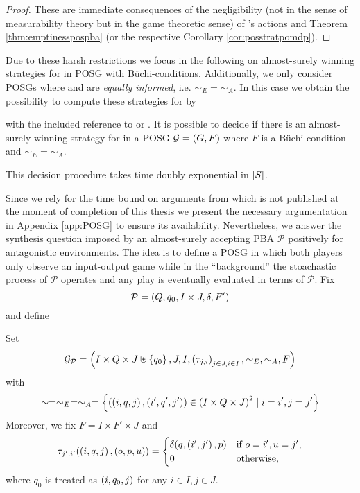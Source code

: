 \begin{proof}
  These are immediate consequences of the negligibility (not in the sense of
  measurability theory but in the game theoretic sense) of \adam{}'s actions
  and Theorem \ref{thm:emptinesspospba} (or the respective Corollary 
  \ref{cor:posstratpomdp}).
\end{proof}
Due to these harsh restrictions we focus in the following on almost-surely 
winning strategies for \eve{} in \ac{POSG} with Büchi-conditions. Additionally,
we only consider \acp{POSG} where \eve{} and \adam{} are 
\emph{equally informed}, i.e. $\sim_{E} = \sim_{A}$. In this case
we obtain the possibility to compute these strategies for \eve{} by
\begin{theorem}
  \cite[Theorem 6]{POSG} with the included reference to 
  \cite[Lemma 4]{DecProblemsForProbAuto} or \cite[Theorem 5.3]{PureStratPOSG}.
  It is possible to decide if there is an almost-surely winning strategy for 
  \eve{} in a \ac{POSG} $\mathcal{G} = \left(G, F\right)$ where $F$ is a 
  Büchi-condition and $\sim_{E} = \sim_{A}$.

  This decision procedure takes time doubly exponential in $\left\vert{S}\right\vert$.
  \label{thm:StratPOSG}
\end{theorem}
Since we rely for the time bound on arguments from \cite{PureStratPOSG} which 
is not published at the moment of completion of this thesis we present the 
necessary argumentation in Appendix \ref{app:POSG} to ensure its availability.
Nevertheless, we answer the synthesis question imposed by an almost-surely
accepting \ac{PBA} $\mathcal{P}$ positively for antagonistic environments. The 
idea is to define a \ac{POSG} in which both players only observe an 
input-output game while in the \enquote{background} the stoachastic process of
$\mathcal{P}$ operates and any play is eventually evaluated in terms of 
$\mathcal{P}$. Fix
\begin{equation*}
  \mathcal{P} = \left(Q, q_{0}, I\times J, \delta, F'\right)
\end{equation*}
and define
\begin{definition}
  Set
  \begin{equation*}
    \mathcal{G}_{\mathcal{P}} = \left(I\times Q\times J\uplus\left\{q_{0}\right\}, J,
      I, \left(\tau_{j,i}\right)_{j\in J,i\in I}, \sim_{E}, \sim_{A}, F\right)
  \end{equation*}
  with
  \begin{equation*}
    \sim = \sim_{E} = \sim_{A} = \left\{\left(\left(i, q, j\right), 
    \left(i', q', j'\right)\right)\in \left(I\times Q\times J\right)^{2}\mid i = i', j = j'\right\}
  \end{equation*}
  Moreover, we fix $F = I\times F'\times J$ and
  \begin{equation*}
    \tau_{j',i'}(\left(i, q, j\right), \left(o, p, u\right)) = \begin{cases}
      \delta(q, \left(i', j'\right), p)&\text{if }o = i', u = j',\\
      0&\text{otherwise},
    \end{cases}
  \end{equation*}
  where $q_{0}$ is treated as $\left(i, q_{0}, j\right)$ for any $i\in I, j\in J$.
\end{definition}
